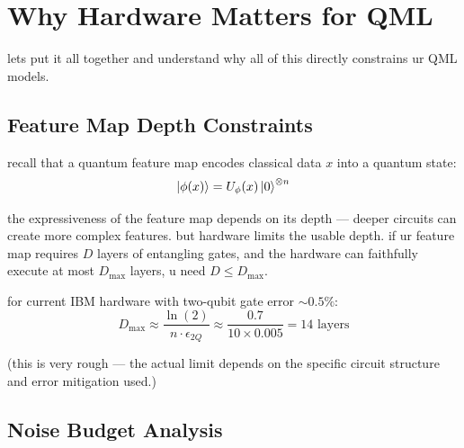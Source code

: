 \documentclass[11pt,a4paper]{article}
\theoremstyle{definition}
\theoremstyle{remark}
\begin{document}
\section{Why Hardware Matters for QML}

lets put it all together and understand why all of this directly constrains ur QML models.

\subsection{Feature Map Depth Constraints}

recall that a quantum feature map encodes classical data $x$ into a quantum state:
\[
\ket{\phi(x)} = U_{\phi}(x) \ket{0}^{\otimes n}
\]

the expressiveness of the feature map depends on its depth --- deeper circuits can create more complex features. but hardware limits the usable depth. if ur feature map requires $D$ layers of entangling gates, and the hardware can faithfully execute at most $D_{\max}$ layers, u need $D \leq D_{\max}$.

for current IBM hardware with two-qubit gate error $\sim 0.5\%$:
\[
D_{\max} \approx \frac{\ln(2)}{n \cdot \epsilon_{2Q}} \approx \frac{0.7}{10 \times 0.005} = 14 \text{ layers}
\]

(this is very rough --- the actual limit depends on the specific circuit structure and error mitigation used.)

\subsection{Noise Budget Analysis}
\end{document}
